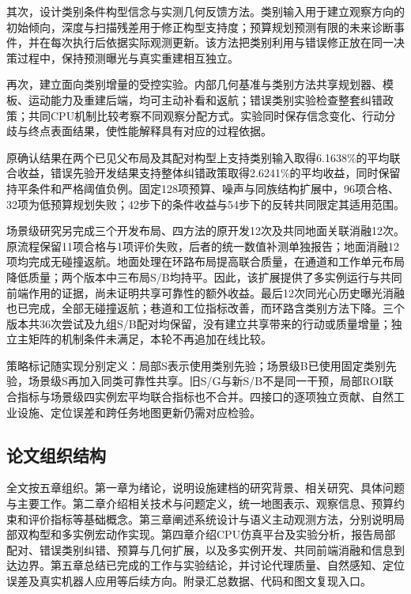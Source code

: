 \documentclass[11pt,a4paper]{article}
\numberwithin{equation}{section}
\begin{document}
其次，设计类别条件构型信念与实测几何反馈方法。类别输入用于建立观察方向的初始倾向，深度与扫描残差用于修正构型支持度；预算规划预测有限的未来诊断事件，并在每次执行后依据实际观测更新。该方法把类别利用与错误修正放在同一决策过程中，保持预测曝光与真实重建相互独立。

再次，建立面向类别增量的受控实验。内部几何基准与类别方法共享规划器、模板、运动能力及重建后端，均可主动补看和返航；错误类别实验检查整套纠错政策；共同CPU机制比较考察不同观察分配方式。实验同时保存信念变化、行动分歧与终点表面结果，使性能解释具有对应的过程依据。

原确认结果在两个已见父布局及其配对构型上支持类别输入取得6.1638\%的平均联合收益，错误先验开发结果支持整体纠错政策取得2.6241\%的平均收益，同时保留持平条件和严格阈值负例。固定128项预算、噪声与同族结构扩展中，96项合格、32项为低预算规划失败；42步下的条件收益与54步下的反转共同限定其适用范围。

场景级研究另完成三个开发布局、四方法的原开发12次及共同地面关联消融12次。原流程保留11项合格与1项评价失败，后者的统一数值补测单独报告；地面消融12项均完成无碰撞返航。地面处理在环路布局提高联合质量，在通道和工作单元布局降低质量；两个版本中三布局S/B均持平。因此，该扩展提供了多实例运行与共同前端作用的证据，尚未证明共享可靠性的额外收益。最后12次同光心历史曝光消融也已完成，全部无碰撞返航；巷道和工位指标改善，而环路含类别方法下降。三个版本共36次尝试及九组S/B配对均保留，没有建立共享带来的行动或质量增量；独立主矩阵的机制条件未满足，本轮不再追加在线比较。

策略标记随实现分别定义：局部S表示使用类别先验；场景级B已使用固定类别先验，场景级S再加入同类可靠性共享。旧S/G与新S/B不是同一干预，局部ROI联合指标与场景级四实例宏平均联合指标也不合并。四接口的逐项独立贡献、自然工业设施、定位误差和跨任务地图更新仍需对应检验。

\hypertarget{ux8bbaux6587ux7ec4ux7ec7ux7ed3ux6784}{%
\subsection{论文组织结构}\label{ux8bbaux6587ux7ec4ux7ec7ux7ed3ux6784}}

全文按五章组织。第一章为绪论，说明设施建档的研究背景、相关研究、具体问题与主要工作。第二章介绍相关技术与问题定义，统一地图表示、观察信息、预算约束和评价指标等基础概念。第三章阐述系统设计与语义主动观测方法，分别说明局部双构型和多实例宏动作实现。第四章介绍CPU仿真平台及实验分析，报告局部配对、错误类别纠错、预算与几何扩展，以及多实例开发、共同前端消融和信息到达边界。第五章总结已完成的工作与实验结论，并讨论代理质量、自然感知、定位误差及真实机器人应用等后续方向。附录汇总数据、代码和图文复现入口。
\end{document}
